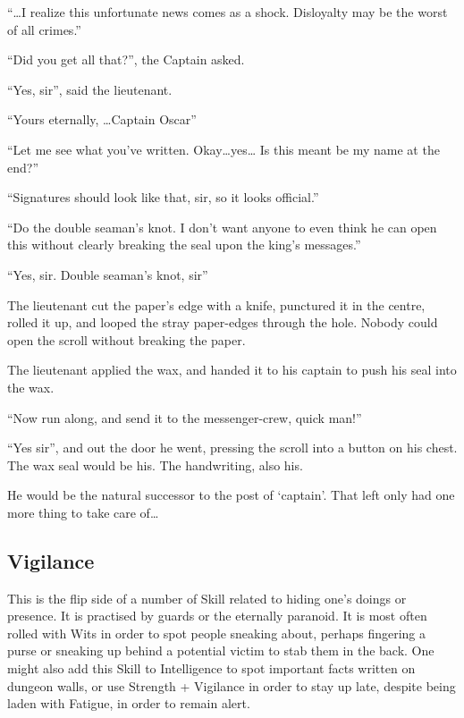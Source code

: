 \begin{multicols}{2}
\begin{exampletext}

  ``\ldots I realize this unfortunate news comes as a shock.
  Disloyalty may be the worst of all crimes.''

  ``Did you get all that?'', the Captain asked.

  ``Yes, sir'', said the lieutenant.

  ``Yours eternally, \ldots Captain Oscar''

  ``Let me see what you've written.
  Okay\ldots yes\ldots
  Is this meant be my name at the end?''

  ``Signatures should look like that, sir, so it looks official.''

  ``Do the double seaman's knot.
  I don't want anyone to even think he can open this without clearly breaking the seal upon the king's messages.''

  ``Yes, sir.
  Double seaman's knot, sir''

  The lieutenant cut the paper's edge with a knife, punctured it in the centre, rolled it up, and looped the stray paper-edges through the hole.
  Nobody could open the scroll without breaking the paper.

  The lieutenant applied the wax, and handed it to his captain to push his seal into the wax.

  ``Now run along, and send it to the messenger-crew, quick man!''

  ``Yes sir'', and out the door he went, pressing the scroll into a button on his chest.
  The wax seal would be his.
  The handwriting, also his.

  He would be the natural successor to the post of `captain'.
  That left only had one more thing to take care of\ldots
  
\end{exampletext}

\subsection{Vigilance}

This is the flip side of a number of Skill related to hiding one's doings or presence.
It is practised by guards or the eternally paranoid.
It is most often rolled with Wits in order to spot people sneaking about, perhaps fingering a purse or sneaking up behind a potential victim to stab them in the back.
One might also add this Skill to Intelligence to spot important facts written on dungeon walls, or use Strength + Vigilance in order to stay up late, despite being laden with Fatigue, in order to remain alert.


\end{multicols}
